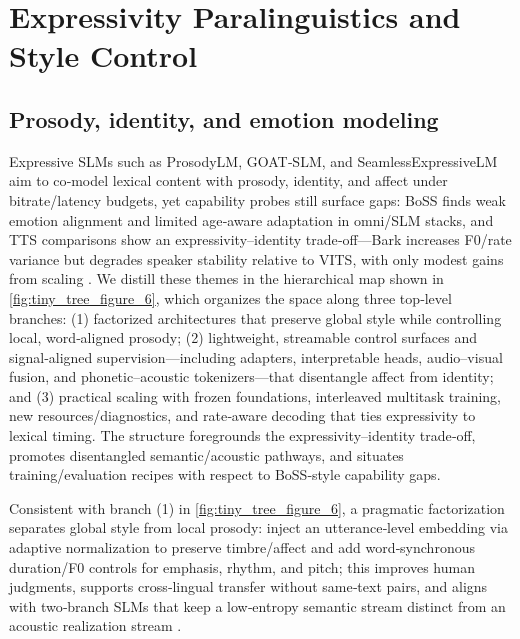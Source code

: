 \documentclass{article}
\begin{document}
\section{Expressivity Paralinguistics and Style Control} \label{sec:Expressivity Paralinguistics and Style Control}

\subsection{Prosody, identity, and emotion modeling} \label{subsec:Prosody, identity, and emotion modeling}
Expressive SLMs such as ProsodyLM, GOAT‑SLM, and SeamlessExpressiveLM aim to co‑model lexical content with prosody, identity, and affect under bitrate/latency budgets, yet capability probes still surface gaps: BoSS finds weak emotion alignment and limited age‑aware adaptation in omni/SLM stacks, and TTS comparisons show an expressivity–identity trade‑off—Bark increases F0/rate variance but degrades speaker stability relative to VITS, with only modest gains from scaling \cite{wang2025bossbeyondsemanticspeech,wang2024evaluatingtextspeechsynthesislargediscre}. We distill these themes in the hierarchical map shown in \autoref{fig:tiny_tree_figure_6}, which organizes the space along three top‑level branches: (1) factorized architectures that preserve global style while controlling local, word‑aligned prosody; (2) lightweight, streamable control surfaces and signal‑aligned supervision—including adapters, interpretable heads, audio–visual fusion, and phonetic–acoustic tokenizers—that disentangle affect from identity; and (3) practical scaling with frozen foundations, interleaved multitask training, new resources/diagnostics, and rate‑aware decoding that ties expressivity to lexical timing. The structure foregrounds the expressivity–identity trade‑off, promotes disentangled semantic/acoustic pathways, and situates training/evaluation recipes with respect to BoSS‑style capability gaps.

Consistent with branch (1) in \autoref{fig:tiny_tree_figure_6}, a pragmatic factorization separates global style from local prosody: inject an utterance‑level embedding via adaptive normalization to preserve timbre/affect and add word‑synchronous duration/F0 controls for emphasis, rhythm, and pitch; this improves human judgments, supports cross‑lingual transfer without same‑text pairs, and aligns with two‑branch SLMs that keep a low‑entropy semantic stream distinct from an acoustic realization stream \cite{huang2023holisticcascadesystembenchmarkhumanevalu}. 
\end{document}
